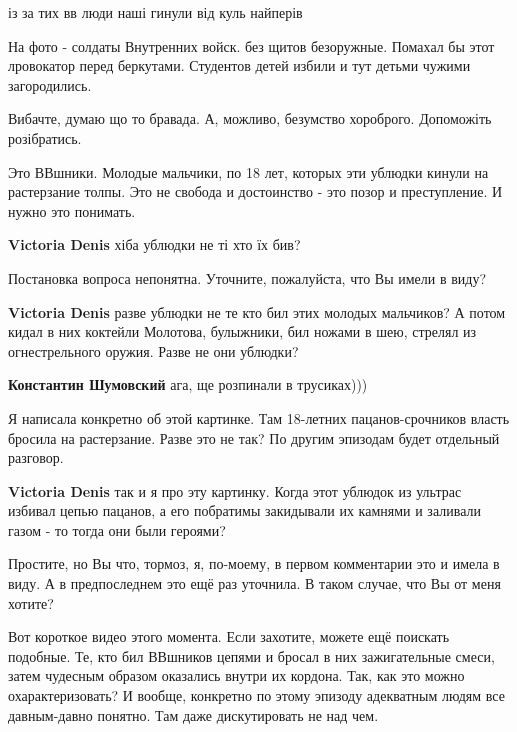 \begin{multicols}{2}
із за тих вв люди наші гинули від куль найперів


На фото - солдаты Внутренних войск. без щитов безоружные. Помахал бы этот
лровокатор перед беркутами. Студентов детей избили и тут детьми чужими
загородились.


Вибачте, думаю що то бравада. А, можливо, безумство хороброго. Допоможіть
розібратись.


Это ВВшники. Молодые мальчики, по 18 лет, которых эти ублюдки кинули на
растерзание толпы. Это не свобода и достоинство - это позор и преступление. И
нужно это понимать.

\begin{itemize} %
\textbf{Victoria Denis} хіба ублюдки не ті хто їх бив?

Постановка вопроса непонятна. Уточните, пожалуйста, что Вы имели в виду?

\textbf{Victoria Denis} разве ублюдки не те кто бил этих молодых мальчиков? А потом кидал в них коктейли Молотова, булыжники, бил ножами в шею, стрелял из огнестрельного оружия. Разве не они ублюдки?

\textbf{Константин Шумовский} ага, ще розпинали в трусиках)))

Я написала конкретно об этой картинке. Там 18-летних пацанов-срочников власть бросила на растерзание. Разве это не так? По другим эпизодам будет отдельный разговор.

\textbf{Victoria Denis} так и я про эту картинку. Когда этот ублюдок из ультрас избивал цепью пацанов, а его побратимы закидывали их камнями и заливали газом - то тогда они были героями?


Простите, но Вы что, тормоз, я, по-моему, в первом комментарии это и имела в
виду. А в предпоследнем это ещё раз уточнила. В таком случае, что Вы от меня
хотите?


Вот короткое видео этого момента. Если захотите, можете ещё поискать подобные.
Те, кто бил ВВшников цепями и бросал в них зажигательные смеси, затем чудесным
образом оказались внутри их кордона. Так, как это можно охарактеризовать? И
вообще, конкретно по этому эпизоду адекватным людям все давным-давно понятно.
Там даже дискутировать не над чем.


\end{itemize}
\end{multicols}
